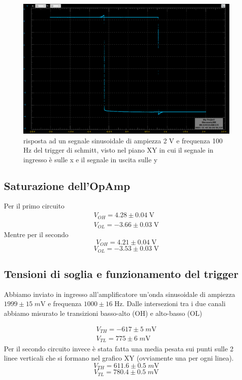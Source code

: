 \documentclass[10pt,a4paper]{article}
\begin{document}
\begin{figure}[htbp]
\centering
\includegraphics[scale=0.4]{shmitt_isteresi}
\caption{risposta ad un segnale sinusoidale di ampiezza 2 V e frequenza 100 Hz del trigger di schmitt, visto nel piano XY in cui il segnale in ingresso è sulle x e il segnale in uscita sulle y}
\end{figure}


\subsection{Saturazione dell'OpAmp}
Per il primo circuito 
\begin{align*}
V_{OH} = 4.28 \pm 0.04 \; \si{\V} \\
V_{OL} = -3.66 \pm 0.03 \; \si{\V}
\end{align*}
Mentre per il secondo
\[
V_{OH} = 4.21 \pm 0.04 \; \si{\V}
\]
\[
V_{OL} = -3.53 \pm 0.03 \; \si{\V}
\]
\subsection{Tensioni di soglia e funzionamento del trigger}
Abbiamo inviato in ingresso all'amplificatore un'onda sinusoidale di ampiezza
$1999 \pm 15 \; \si{m\V}$ e frequenza $1000 \pm 16 \; \si{\Hz}$.
Dalle intersezioni tra i due canali abbiamo misurato le transizioni basso-alto
(OH) e alto-basso (OL)

\begin{align*}
V_{TH} = -617 \pm 5 \; \si{m\V} \\
V_{TL} = 775 \pm 6 \; \si{m\V}
\end{align*}
Per il secondo circuito invece è stata fatta una media pesata sui punti sulle 2 linee verticali che si formano nel grafico XY (ovviamente una per ogni linea).
\[
V_{TH} = 611.6 \pm 0.5 \; \si{m\V}
\]
\[
V_{TL} = 780.4 \pm 0.5 \; \si{m\V}
\]
\end{document}
